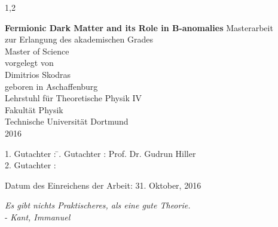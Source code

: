 \documentclass[11pt,a4paper,twoside]{article}
\numberwithin{equation}{section}
\begin{document}
\begin{spacing}{1,2}

%
%


\newcommand{\thetitle}{Fermionic Dark Matter and its Role in B-anomalies}

\thispagestyle{empty}
\begin{center}

\Huge\textbf{\thetitle}
\vfill
\vfill
\Large
Masterarbeit\\ zur Erlangung des akademischen Grades \\ Master of Science \\
\vspace{20pt}
\normalsize
vorgelegt von \\[5pt]
{\Large Dimitrios Skodras} \\[5pt]
geboren in Aschaffenburg \\
\vspace{20pt}
Lehrstuhl für Theoretische Physik IV \\ Fakultät Physik \\
Technische Universität Dortmund \\ 2016
\end{center}
\newpage

\thispagestyle{empty}
\vspace*{\fill}
\begin{tabbing}
1. Gutachter : \=. Gutachter : \>Prof. Dr. Gudrun Hiller \\[11pt]
2. Gutachter : \> \\[11pt]
\end{tabbing}
\vspace{11pt}
Datum des Einreichens der Arbeit: 31. Oktober, 2016
\newpage
\thispagestyle{empty}
\begin{flushright} 
\textit{\grqq Es gibt nichts Praktischeres, als eine gute Theorie.\grqq}\\
- \textit{Kant, Immanuel}\\
\vspace{2cm}
\end{flushright}


\end{spacing}
\end{document}
